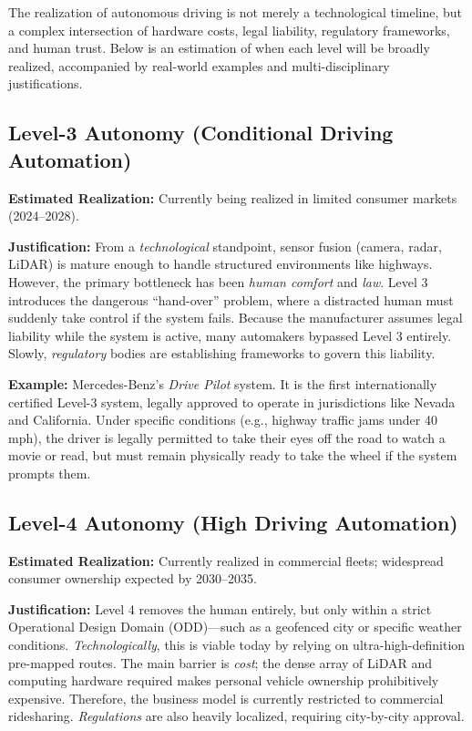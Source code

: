 \documentclass{article}
\begin{document}
The realization of autonomous driving is not merely a technological timeline, but a complex intersection of hardware costs, legal liability, regulatory frameworks, and human trust. Below is an estimation of when each level will be broadly realized, accompanied by real-world examples and multi-disciplinary justifications.

\subsection*{Level-3 Autonomy (Conditional Driving Automation)}
\textbf{Estimated Realization:} Currently being realized in limited consumer markets (2024--2028).

\textbf{Justification:} 
From a \textit{technological} standpoint, sensor fusion (camera, radar, LiDAR) is mature enough to handle structured environments like highways. However, the primary bottleneck has been \textit{human comfort} and \textit{law}. Level 3 introduces the dangerous ``hand-over'' problem, where a distracted human must suddenly take control if the system fails. Because the manufacturer assumes legal liability while the system is active, many automakers bypassed Level 3 entirely. Slowly, \textit{regulatory} bodies are establishing frameworks to govern this liability.

\textbf{Example:} 
Mercedes-Benz’s \textit{Drive Pilot} system. It is the first internationally certified Level-3 system, legally approved to operate in jurisdictions like Nevada and California. Under specific conditions (e.g., highway traffic jams under 40 mph), the driver is legally permitted to take their eyes off the road to watch a movie or read, but must remain physically ready to take the wheel if the system prompts them.

\subsection*{Level-4 Autonomy (High Driving Automation)}
\textbf{Estimated Realization:} Currently realized in commercial fleets; widespread consumer ownership expected by 2030--2035.

\textbf{Justification:} 
Level 4 removes the human entirely, but only within a strict Operational Design Domain (ODD)—such as a geofenced city or specific weather conditions. \textit{Technologically}, this is viable today by relying on ultra-high-definition pre-mapped routes. The main barrier is \textit{cost}; the dense array of LiDAR and computing hardware required makes personal vehicle ownership prohibitively expensive. Therefore, the business model is currently restricted to commercial ridesharing. \textit{Regulations} are also heavily localized, requiring city-by-city approval.
\end{document}
